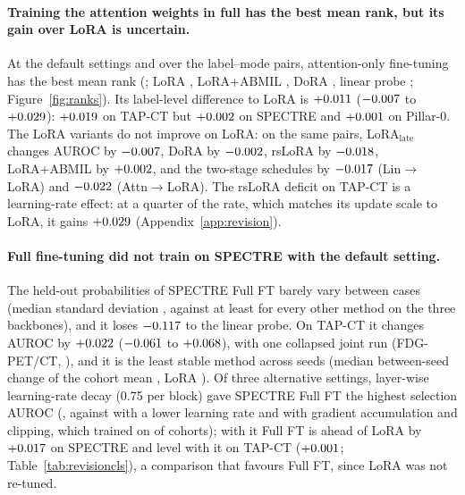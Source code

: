 \paragraph{Training the attention weights in full has the best mean rank, but its gain over LoRA is uncertain.} At the default settings and over the \numRankSlotsN{} label--mode pairs, attention-only fine-tuning has the best mean rank (\numRankAttnftMean{}; LoRA \numRankLoraMean{}, LoRA+ABMIL \numRankBabmilMean{}, DoRA \numRankDoraMean{}, linear probe \numRankLinMean{}; Figure~\ref{fig:ranks}). Its label-level difference to LoRA is $+0.011$ ($-0.007$ to $+0.029$): $+0.019$ on TAP-CT but $+0.002$ on SPECTRE and $+0.001$ on Pillar-0. The LoRA variants do not improve on LoRA: on the same pairs, LoRA$_{\text{late}}$ changes AUROC by $-0.007$, DoRA by $-0.002$, rsLoRA by $-0.018$, LoRA+ABMIL by $+0.002$, and the two-stage schedules by $-0.017$ (Lin$\to$LoRA) and $-0.022$ (Attn$\to$LoRA). The rsLoRA deficit on TAP-CT is a learning-rate effect: at a quarter of the rate, which matches its update scale to LoRA, it gains $+0.029$ (Appendix~\ref{app:revision}).

\paragraph{Full fine-tuning did not train on SPECTRE with the default setting.}\label{sec:fullft} The held-out probabilities of SPECTRE Full FT barely vary between cases (median standard deviation \numSpreadSpectreFullft{}, against at least \numSpreadOthermin{} for every other method on the three backbones), and it loses $-0.117$ to the linear probe. On TAP-CT it changes AUROC by $+0.022$ ($-0.061$ to $+0.068$), with one collapsed joint run (FDG-PET/CT, \numClsAurocFdgTapctJointFullft{}), and it is the least stable method across seeds (median between-seed change of the cohort mean \numSeedsclsFullftSdmedian{}, LoRA \numSeedsclsLoraSdmedian{}). Of three alternative settings, layer-wise learning-rate decay (0.75 per block) gave SPECTRE Full FT the highest selection AUROC (\numFixSpectreFullftLlrdVal{}, against \numFixSpectreFullftLowlrVal{} with a lower learning rate and \numFixSpectreFullftAccumVal{} with gradient accumulation and clipping, which trained on \numFixSpectreFullftAccumTrainedN{} of \numFixSpectreFullftAccumCohortsN{} cohorts); with it Full FT is ahead of LoRA by $+0.017$ on SPECTRE and level with it on TAP-CT ($+0.001$; Table~\ref{tab:revisioncls}), a comparison that favours Full FT, since LoRA was not re-tuned.

